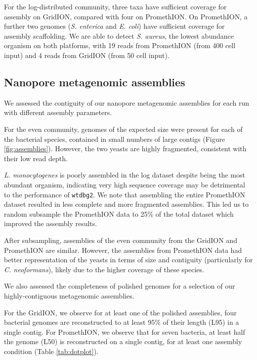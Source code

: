 \documentclass[a4paper,num-refs]{oup-contemporary}
\begin{document}
For the log-distributed community, three taxa have sufficient coverage for assembly on GridION, compared with four on PromethION. On PromethION, a further two genomes (\textit{S. enterica} and \textit{E. coli}) have sufficient coverage for assembly scaffolding. We are able to detect \textit{S. aureus}, the lowest abundance organism on both platforms, with 19 reads from PromethION (from 400 cell input) and 4 reads from GridION (from 50 cell input).

\subsection{Nanopore metagenomic assemblies}

We assessed the contiguity of our nanopore metagenomic assemblies for each run with different assembly parameters.

For the even community, genomes of the expected size were present for each of the bacterial species, contained in small numbers of large contigs (Figure \ref{fig:assemblies}). However, the two yeasts are highly fragmented, consistent with their low read depth. 

\textit{L. monocytogenes} is poorly assembled in the log dataset despite being the most abundant organism, indicating very high sequence coverage may be detrimental to the performance of \texttt{wtdbg2}. We note that assembling the entire PromethION dataset resulted in less complete and more fragmented assemblies.
This led us to random subsample the PromethION data to 25\% of the total dataset which improved the assembly results.

After subsampling, assemblies of the even community from the GridION and PromethION are similar. However, the assemblies from PromethION data had better representation of the yeasts in terms of size and contiguity (particularly for \textit{C. neoformans}), likely due to the higher coverage of these species.

We also assessed the completeness of polished genomes for a selection of our highly-contiguous metagenomic assemblies.

For the GridION, we observe for at least one of the polished assemblies, four bacterial genomes are reconstructed to at least 95\% of their length (L95) in a single contig. For PromethION, we observe that for seven bacteria, at least half the genome (L50) is reconstructed on a single contig, for at least one assembly condition (Table \ref{tab:dotplot}).
\end{document}
